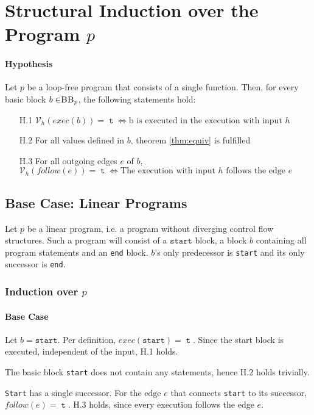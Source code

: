 \section*{Structural Induction over the Program $p$}

\paragraph{Hypothesis}
Let $p$ be a loop-free program that consists of a single function. Then, for every basic block $b \in \mbb_p$, the following statements hold:
\begin{enumerate}
    \item[H.1] $\mathcal{V}_h(exec(b)) = \mttt \iff \text{b is executed in the execution with input $h$}$
    \item[H.2] For all values defined in $b$, theorem \ref{thm:equiv} is fulfilled
    \item[H.3] For all outgoing edges $e$ of $b$,\\ $\mathcal{V}_h(follow(e)) = \mttt \iff \text{The execution with input $h$ follows the edge $e$}$
\end{enumerate}

\subsection*{Base Case: Linear Programs}
Let $p$ be a linear program, i.e. a program without diverging control flow structures. Such a program will consist of a $\texttt{start}$ block, a block $b$ containing all program statements and an \texttt{end} block. $b$'s only predecessor is \texttt{start} and its only successor is \texttt{end}.

\subsubsection{Induction over $p$}
\paragraph{Base Case}
Let $b = \mathtt{start}$. Per definition, $exec(\mathtt{start}) = \mttt$. Since the start block is executed, independent of the input, H.1 holds.

The basic block \texttt{start} does not contain any statements, hence H.2 holds trivially.

\texttt{Start} has a single successor. For the edge $e$ that connects \texttt{start} to its successor, $follow(e) = \mttt$. H.3 holds, since every execution follows the edge $e$.

